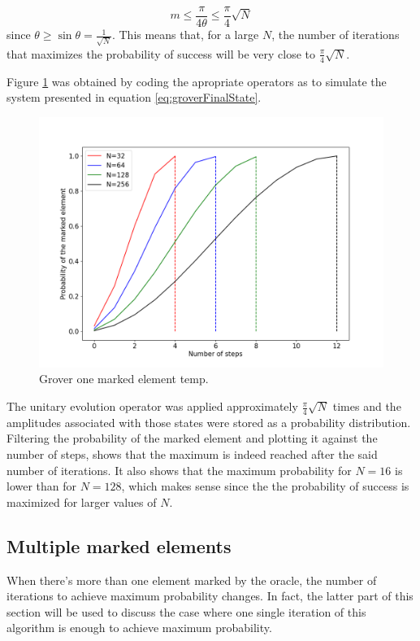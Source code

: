 \documentclass[../../dissertation.tex]{subfiles}
\begin{document}
\begin{equation}
	m \leq \frac{\pi}{4\theta} \leq \frac{\pi}{4}\sqrt{N}
\end{equation}
since $\theta \geq \sin\theta = \frac{1}{\sqrt{N}}$. This means that, for a
large $N$, the number of iterations that maximizes the probability of success
will be very close to $\frac{\pi}{4}\sqrt{N}$.\par Figure
\ref{fig:groverOneMarked163264128} was obtained by coding the apropriate
operators as to simulate the system presented in equation
\ref{eq:groverFinalState}. 
\begin{figure}[!h]
	\centering
	\includegraphics[scale=0.40]{img/Grover/GroverOneMarked3264128256}
	\caption{Grover one marked element temp.} 
	\label{fig:groverOneMarked163264128}
\end{figure}
The unitary evolution operator was applied approximately
$\frac{\pi}{4}\sqrt{N}$ times and the amplitudes associated with those states
were stored as a probability distribution. Filtering the probability of the
marked element and plotting it against the number of steps, shows that the
maximum is indeed reached after the said number of iterations. It also shows
that the maximum probability for $N=16$ is lower than for $N=128$, which makes
sense since the the probability of success is maximized for larger values of
$N$.

\subsection{Multiple marked elements}
When there's more than one element marked by the oracle, the number of
iterations to achieve maximum probability changes. In fact, the latter part of
this section will be used to discuss the case where one single iteration of
this algorithm is enough to achieve maximum probability.\par 
\end{document}
